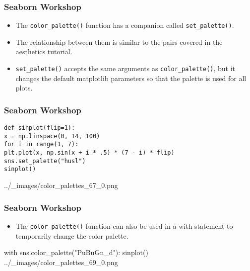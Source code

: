 \documentclass{beamer}
\begin{document}
\begin{frame}[fragile]
\frametitle{Seaborn Workshop}
\large
\begin{itemize}
\item The \texttt{color\_palette()} function has a companion called \texttt{set\_palette()}. 
\item The relationship between them is similar to the pairs covered in the aesthetics tutorial. 
\item \texttt{set\_palette()} accepts the same arguments as \texttt{color\_palette()}, but it changes the default matplotlib parameters so that the palette is used for all plots.
\end{itemize}

\end{frame}
\begin{frame}[fragile]
	\frametitle{Seaborn Workshop}
	\large
\begin{framed}
	\begin{verbatim}
def sinplot(flip=1):
x = np.linspace(0, 14, 100)
for i in range(1, 7):
plt.plot(x, np.sin(x + i * .5) * (7 - i) * flip)
sns.set_palette("husl")
sinplot()
	\end{verbatim}
\end{framed}
../_images/color_palettes_67_0.png
\end{frame}
\begin{frame}[fragile]
	\frametitle{Seaborn Workshop}
	\large
\begin{itemize}
\item The \texttt{color\_palette()} function can also be used in a with statement to temporarily change the color palette.
\end{itemize}
with sns.color_palette("PuBuGn_d"):
    sinplot()
../_images/color_palettes_69_0.png
\end{frame}
\end{document}
